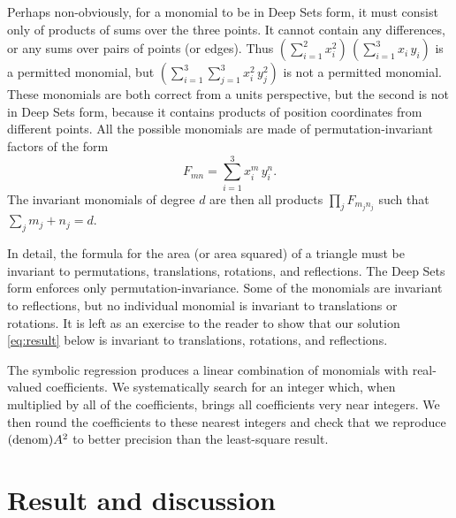 \documentclass[12pt]{article}
\begin{document}
Perhaps non-obviously, for a monomial to be in Deep Sets form, it must consist only of products of sums over the three points.
It cannot contain any differences, or any sums over pairs of points (or edges).
Thus $(\sum_{i=1}^2 x_i^2)\,(\sum_{i=1}^3 x_i\,y_i)$ is a permitted monomial, but $(\sum_{i=1}^3\sum_{j=1}^3 x_i^2\,y_j^2)$ is not a permitted monomial.
These monomials are both correct from a units perspective, but the second is not in Deep Sets form, because it contains products of position coordinates from different points. 
All the possible monomials are made of permutation-invariant factors of the form 
\begin{equation}
F_{mn} = \sum_{i=1}^{3} x_i^m \, y_i^n.
\end{equation}
The invariant monomials of degree $d$ are then all products $\prod_j F_{m_j n_j}$ such that $\sum_j m_j + n_j = d$.

In detail, the formula for the area (or area squared) of a triangle must be invariant to permutations, translations, rotations, and reflections.
The Deep Sets form enforces only permutation-invariance.
Some of the monomials are invariant to reflections, but no individual monomial is invariant to translations or rotations.
It is left as an exercise to the reader to show that our solution \eqref{eq:result} below is invariant to translations, rotations, and reflections.

The symbolic regression produces a linear combination of monomials with real-valued coefficients.
We systematically search for an integer which, when multiplied by all of the coefficients, brings all coefficients very near integers.
We then round the coefficients to these nearest integers and check that we reproduce $({\rm denom}) A^2$ to better precision than the least-square result.


\section{Result and discussion}\label{sec:result}
\end{document}
